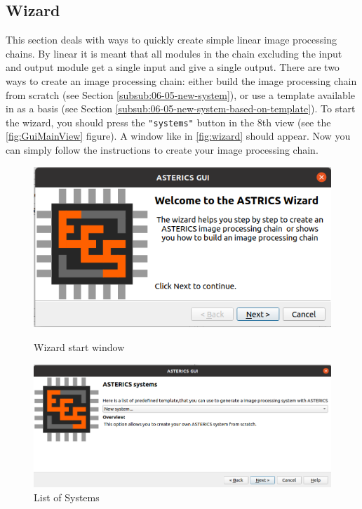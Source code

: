 	\subsection{Wizard}\label{sec:06-05-wizard}
	This section deals with ways to quickly create simple linear image processing chains. By linear it is meant that all modules in the chain excluding the input and output module get a single input and give a single output.
	There are two ways to create an image processing chain: either build the image processing chain from scratch (see Section \ref{subsub:06-05-new-system}), or use a template available in \asterics as a basis (see Section \ref{subsub:06-05-new-system-based-on-template}).
	To start the wizard, you should press the \texttt{"systems"} button in the 8th view (see the \ref{fig:GuiMainView} figure). A window like in \ref{fig:wizard} should appear. Now you can simply follow the instructions to create your image processing chain.
	\begin{figure}[!ht]
		\centering
		\begin{minipage}{0.45\textwidth}
			\centering
			\includegraphics[width=\textwidth]{figs/gui/wizard}
			\caption{Wizard start window}
			\label{fig:wizard}
		\end{minipage} 
		\hfill
		\begin{minipage}{0.45\textwidth}
			\centering
			\includegraphics[width=\textwidth,]{figs/gui/list}
			\caption{List of \asterics Systems}

			\label{fig:astericsList}
		\end{minipage}
		
		
	\end{figure}
